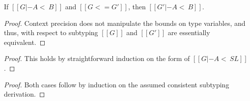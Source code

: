 \begin{lemma}
  \label{lemma:subtyping_context_precision}
  If $[[G |- A <~ B]]$ and $[[G <= G']]$, then $[[G' |- A <~ B]]$.
\end{lemma}
\begin{proof}
  Context precision does not manipulate the bounds on type variables, and thus,
  with respect to subtyping $[[G]]$ and $[[G']]$ are essentially equivalent.
\end{proof}

\begin{proof}
  This holds by straightforward induction on the form of $[[G |- A <~ SL]]$.
\end{proof}

\begin{proof}
  Both cases follow by induction on the assumed consistent subtyping
  derivation.
\end{proof}

